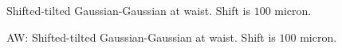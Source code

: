 \documentclass[aps,twoside,secnumarabic,balancelastpage,amsmath,amssymb,nofootinbib,hyperref=pdftex]{revtex4}
\begin{document}
\clearpage

	\begin{figure}
	\centering
	\caption{Shifted-tilted Gaussian-Gaussian at waist. Shift is $100$ micron.}
	\label{fig:16}
	\end{figure}
	
	\begin{figure}
	\centering
	\caption{AW: Shifted-tilted Gaussian-Gaussian at waist. Shift is $100$ micron.}
	\label{fig:17}
	\end{figure}
	
\clearpage

\clearpage
	
\end{document}
